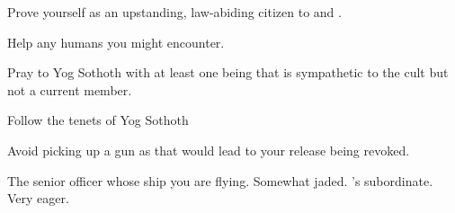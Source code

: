 \documentclass[char]{guildcamp4}
\begin{document}
\begin{itemz}[Goals]
	\item Prove yourself as an upstanding, law-abiding citizen to \cCbad{} and \cCgood{}.
	\item Help any humans you might encounter.
	\item Pray to Yog Sothoth with at least one being that is sympathetic to the cult but not a current member.
	\item Follow the tenets of Yog Sothoth
	\item Avoid picking up a gun as that would lead to your release being revoked.
\end{itemz}

\begin{contacts}
	\contact{\cCbad{}} The senior officer whose ship you are flying. Somewhat jaded.
	\contact{\cCgood{}} \cCbad{}'s subordinate. Very eager.
\end{contacts}
\end{document}
